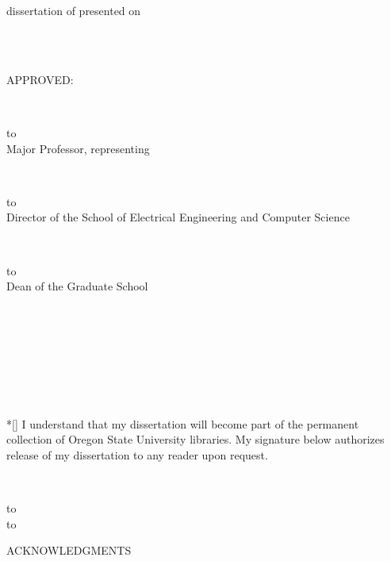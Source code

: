 \documentclass[12pt,letterpaper]{gthesis2}  %
\begin{document}
%
\clearpage
%
\DisplayCopyright %
%
%
\DisplayTitlePage %
%
%
%
\thispagestyle{empty} {\baselineskip=14.5pt
\def\ruleline{\hbox to \hsize{\hrulefill}\\[-2ex]}
\noindent \underline{\mydegree} dissertation of \underline{\myname}
presented on \underline{\myday}
\strut\\
\strut\\
APPROVED:\\
\strut\\
\strut
\ruleline
Major Professor, representing \mymajor\\
\strut\\
\strut
\ruleline
Director of the School of Electrical Engineering and Computer Science \\
\strut\\
\strut
\ruleline
Dean of the Graduate School\\
\strut\\
\strut\\
\strut\\
\strut\\\\*[\baselineskip]
\noindent I understand that my dissertation will become part of the permanent
collection of Oregon State University libraries.  My signature
below authorizes release of my dissertation to any reader upon request.\\
\strut\\
\strut
\ruleline \hbox to \textwidth{\hfil \myname, Author \hfil} }
%
%
%
%
%
\clearpage
\thispagestyle{empty}
\begin{center}
ACKNOWLEDGMENTS
\end{center}
%
%
\end{document}
